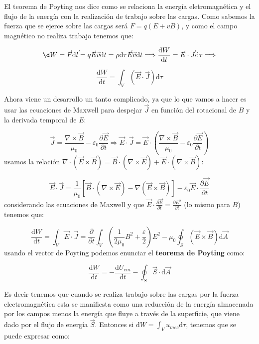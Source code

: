 \documentclass[12pt]{article}
\newcommand{\parentesis}[1]{\left( #1  \right)}
\newcommand{\parciales}[2]{\frac{\partial #1}{\partial #2}}
\newcommand{\D}{\mathrm{d}}
\begin{document}
El teorema de Poyting nos dice como se relaciona la energía eletromagnética y el flujo de la energía con la realización de trabajo sobre las cargas. Como sabemos la fuerza que se ejerce sobre las cargas será $F = q(E+vB)$, y como el campo magnético no realiza trabajo tenemos que:

$$ \d W = \vec{F} \D \vec{l} = q \vec{E} \vec{v} \D t = \rho \D \tau \vec{E}  \vec{v} \D t  \Longrightarrow \dfrac{\D W}{\D t} = \vec{E} \cdot \vec{J} \D \tau \Longrightarrow$$

\begin{equation}
\dfrac{\D W}{\D t} = \int_V (\vec{E} \cdot \vec{J}) \D \tau \label{Ec:6.3.Trabajo}
\end{equation}

Ahora viene un desarrollo un tanto complicado, ya que lo que vamos a hacer es usar las ecuaciones de Maxwell para despejar $\vec{J}$ en función del rotacional de $B$ y la derivada temporal de $E$:

$$ \vec{J} = \dfrac{\nabla \times \vec{B}}{\mu_0} - \varepsilon_0 \parciales{\vec{E}}{t} \Longrightarrow \vec{E} \cdot \vec{J} = \vec{E} \cdot \parentesis{\dfrac{\nabla \times \vec{B}}{\mu_0} - \varepsilon_0 \parciales{\vec{E}}{t} }  $$
usamos la relación $\nabla \cdot (\vec{E} \times \vec{B}) = \vec{B} \cdot (\nabla \times \vec{E}) +  \vec{E} \cdot (\nabla \times \vec{B})$:

$$ \vec{E} \cdot \vec{J} = \dfrac{1}{\mu_0} \left[ \vec{B} \cdot (\nabla \times \vec{E}) -  \nabla (\vec{E} \times \vec{B}) \right] - \varepsilon_0 \vec{E} \cdot \parciales{\vec{E}}{t} $$
considerando las ecuaciones de Maxwell y que $\vec{E} \cdot \parciales{\vec{E}}{t}  = \parciales{E^2}{t}$ (lo mismo para $B$) tenemos que:

$$ \dfrac{\D W}{\D t} = \int_V \vec{E} \cdot \vec{J} = \parciales{}{t} \int_V \parentesis{\dfrac{1}{2 \mu_0} B^2 +  \dfrac{\varepsilon}{2}} E^2  - \mu_0 \oint_S (\vec{E} \times \vec{B}) \D \vec{A} $$
usando el vector de Poyting podemos enunciar el \textbf{teorema de Poyting} como:

\begin{equation}
\dfrac{\D W}{\D t} = - \dfrac{\D U_{em}}{\D t} - \oint_S \vec{S} \cdot \D \vec{A}
\end{equation} 

Es decir tenemos que cuando se realiza trabajo sobre las cargas por la fuerza electromagnética esta se manifiesta como una reducción de la energía almacenada por los campos menos la energía que fluye a través de la superficie, que viene dado por el flujo de energía $\vec{S}$. Entonces si $\D W = \int_V u_{mec} \D \tau$, tenemos que se puede expresar como:
\end{document}

